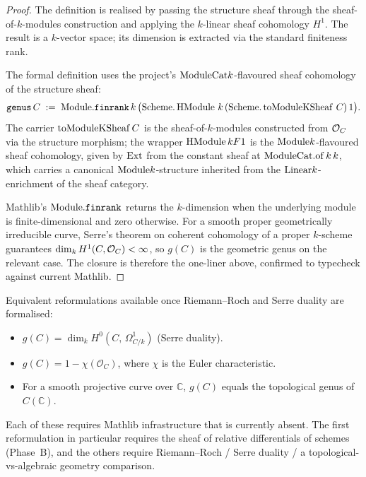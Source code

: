 \begin{proof}
  
  \leanok
  The definition is realised by passing the structure sheaf through the sheaf-of-\(k\)-modules construction and applying the \(k\)-linear sheaf cohomology \(H^1\). The result is a \(k\)-vector space; its dimension is extracted via the standard finiteness rank.

  \begin{remark}
    The formal definition uses the project's \(\mathrm{ModuleCat} k\)-flavoured sheaf cohomology of the structure sheaf:
    \[
      \mathtt{genus}\,C \;:=\; \mathrm{Module}.\mathtt{finrank}\,k\,\bigl(\mathrm{Scheme}.\operatorname{HModule}\,k\,(\mathrm{Scheme}.\operatorname{toModuleKSheaf}\,C)\,1\bigr).
    \]
    The carrier \(\operatorname{toModuleKSheaf} C\) is the sheaf-of-\(k\)-modules constructed from \(\mathcal{O}_{C}\) via the structure morphism; the wrapper \(\operatorname{HModule} k F 1\) is the \(\mathrm{Module} k\)-flavoured sheaf cohomology, given by \(\operatorname{Ext}\) from the constant sheaf at \(\mathrm{ModuleCat}.\mathrm{of}\,k\,k\), which carries a canonical \(\mathrm{Module} k\)-structure inherited from the \(\mathrm{Linear} k\)-enrichment of the sheaf category.
  \end{remark}

  Mathlib's \(\mathrm{Module}.\mathtt{finrank}\) returns the \(k\)-dimension when the underlying module is finite-dimensional and zero otherwise. For a smooth proper geometrically irreducible curve, Serre's theorem on coherent cohomology of a proper \(k\)-scheme guarantees \(\dim_k H^1(C, \mathcal{O}_{C}) < \infty\), so \(g(C)\) is the geometric genus on the relevant case. The closure is therefore the one-liner above, confirmed to typecheck against current Mathlib.
\end{proof}

Equivalent reformulations available once Riemann--Roch and Serre duality are formalised:
\begin{itemize}
  \item \(g(C) = \dim_k H^0(C,\, \Omega^1_{C/k})\) (Serre duality).
  \item \(g(C) = 1 - \chi(\mathcal O_C)\), where \(\chi\) is the Euler characteristic.
  \item For a smooth projective curve over \(\mathbb C\), \(g(C)\) equals the topological genus of \(C(\mathbb C)\).
\end{itemize}
Each of these requires Mathlib infrastructure that is currently absent. The first reformulation in particular requires the sheaf of relative differentials of schemes (Phase~B), and the others require Riemann--Roch / Serre duality / a topological-vs-algebraic geometry comparison.

